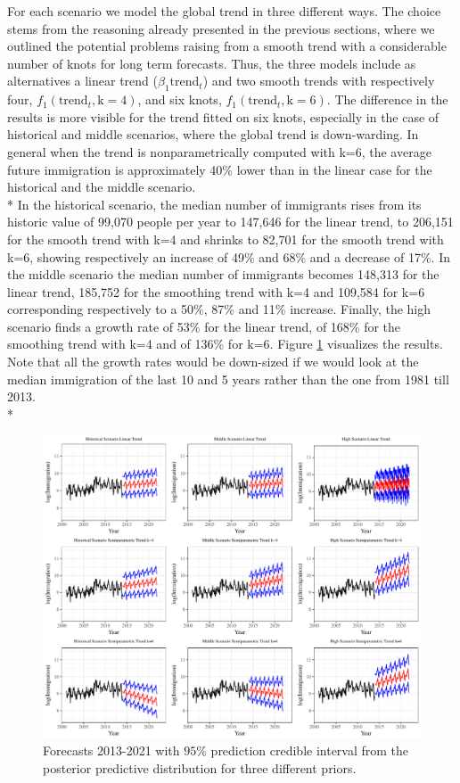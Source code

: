 \documentclass{article}\usepackage[]{graphicx}\usepackage[]{color}
\begin{document}
For each scenario we model the global trend in three different ways. The choice stems from the reasoning already presented in the previous sections, where we outlined the potential problems raising from a smooth trend with a considerable number of knots for long term forecasts. Thus, the three models include as alternatives a linear trend ($\beta_{1}\text{trend}_{t}$) and two smooth trends with respectively four, $f_{1}(\text{trend}_{t}, \text{k}=4)$, and six knots, $f_{1}(\text{trend}_{t}, \text{k}=6)$. The difference in the results is more visible for the trend fitted on six knots, especially in the case of historical and middle scenarios, where the global trend is down-warding. In general when the trend is nonparametrically computed with k=6, the average future immigration is approximately 40\% lower than in the linear case for the historical and the middle scenario.   \\* 
In the historical scenario, the median number of immigrants rises from its historic value of 99,070 people per year to 147,646 for the linear trend, to 206,151 for the smooth trend with k=4 and shrinks to 82,701 for the smooth trend with k=6, showing respectively an increase of 49\% and 68\% and a decrease of 17\%. In the middle scenario the median number of immigrants becomes 148,313 for the linear trend, 185,752 for the smoothing trend with k=4 and 109,584 for k=6 corresponding respectively to a 50\%, 87\% and 11\% increase. Finally, the high scenario finds a growth rate of 53\% for the linear trend, of 168\% for the smoothing trend with k=4 and of 136\% for k=6. Figure \ref{fig:forecast scenarios} visualizes the results. Note that all the growth rates would be down-sized if we would look at the median immigration of the last 10 and 5 years rather than the one from 1981 till 2013. \\*

\begin{figure}[H]
\centering
\includegraphics[scale=0.6]{Forecast_results_new.pdf}
\caption{Forecasts 2013-2021 with $95\%$ prediction credible interval from the posterior predictive distribution for three different priors.}
\label{fig:forecast scenarios}
\end{figure}
\end{document}
